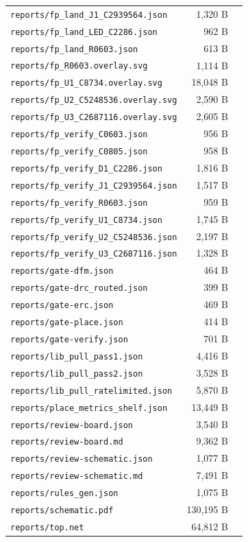 \documentclass[11pt,a4paper]{article}
\begin{document}
{\begin{longtable}{p{9cm}rp{4cm}}
\texttt{reports/fp\_land\_J1\_C2939564.json} & 1,320 B &  \\
\texttt{reports/fp\_land\_LED\_C2286.json} & 962 B &  \\
\texttt{reports/fp\_land\_R0603.json} & 613 B &  \\
\texttt{reports/fp\_R0603.overlay.svg} & 1,114 B &  \\
\texttt{reports/fp\_U1\_C8734.overlay.svg} & 18,048 B &  \\
\texttt{reports/fp\_U2\_C5248536.overlay.svg} & 2,590 B &  \\
\texttt{reports/fp\_U3\_C2687116.overlay.svg} & 2,605 B &  \\
\texttt{reports/fp\_verify\_C0603.json} & 956 B &  \\
\texttt{reports/fp\_verify\_C0805.json} & 958 B &  \\
\texttt{reports/fp\_verify\_D1\_C2286.json} & 1,816 B &  \\
\texttt{reports/fp\_verify\_J1\_C2939564.json} & 1,517 B &  \\
\texttt{reports/fp\_verify\_R0603.json} & 959 B &  \\
\texttt{reports/fp\_verify\_U1\_C8734.json} & 1,745 B &  \\
\texttt{reports/fp\_verify\_U2\_C5248536.json} & 2,197 B &  \\
\texttt{reports/fp\_verify\_U3\_C2687116.json} & 1,328 B &  \\
\texttt{reports/gate-dfm.json} & 464 B &  \\
\texttt{reports/gate-drc\_routed.json} & 399 B &  \\
\texttt{reports/gate-erc.json} & 469 B &  \\
\texttt{reports/gate-place.json} & 414 B &  \\
\texttt{reports/gate-verify.json} & 701 B &  \\
\texttt{reports/lib\_pull\_pass1.json} & 4,416 B &  \\
\texttt{reports/lib\_pull\_pass2.json} & 3,528 B &  \\
\texttt{reports/lib\_pull\_ratelimited.json} & 5,870 B &  \\
\texttt{reports/place\_metrics\_shelf.json} & 13,449 B &  \\
\texttt{reports/review-board.json} & 3,540 B &  \\
\texttt{reports/review-board.md} & 9,362 B &  \\
\texttt{reports/review-schematic.json} & 1,077 B &  \\
\texttt{reports/review-schematic.md} & 7,491 B &  \\
\texttt{reports/rules\_gen.json} & 1,075 B &  \\
\texttt{reports/schematic.pdf} & 130,195 B &  \\
\texttt{reports/top.net} & 64,812 B &  \\
\bottomrule
\end{longtable}
}
\end{document}
